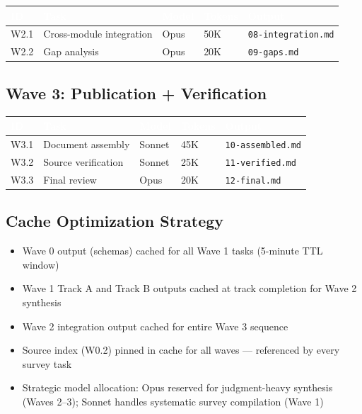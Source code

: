 \documentclass[11pt,letterpaper]{article}
\newcommand{\tableheader}[1]{\textbf{\sffamily\textcolor{white}{#1}}}
\begin{document}
\begin{center}
\begin{tabularx}{\textwidth}{C{0.8cm}L{3cm}C{1.2cm}C{1.2cm}X}
\toprule
{}
\tableheader{ID} & \tableheader{Task} & \tableheader{Model} & \tableheader{Tokens} & \tableheader{Output} \\
\midrule
W2.1 & Cross-module integration & Opus & 50K & \texttt{08-integration.md} \\
W2.2 & Gap analysis & Opus & 20K & \texttt{09-gaps.md} \\
\bottomrule
\end{tabularx}
\end{center}

\subsection{Wave 3: Publication + Verification}

\begin{center}
\begin{tabularx}{\textwidth}{C{0.8cm}L{3cm}C{1.2cm}C{1.2cm}X}
\toprule
{}
\tableheader{ID} & \tableheader{Task} & \tableheader{Model} & \tableheader{Tokens} & \tableheader{Output} \\
\midrule
W3.1 & Document assembly & Sonnet & 45K & \texttt{10-assembled.md} \\
W3.2 & Source verification & Sonnet & 25K & \texttt{11-verified.md} \\
W3.3 & Final review & Opus & 20K & \texttt{12-final.md} \\
\bottomrule
\end{tabularx}
\end{center}

\subsection{Cache Optimization Strategy}

\begin{itemize}[leftmargin=2em]
\item Wave 0 output (schemas) cached for all Wave 1 tasks (5-minute TTL window)
\item Wave 1 Track A and Track B outputs cached at track completion for Wave 2 synthesis
\item Wave 2 integration output cached for entire Wave 3 sequence
\item Source index (W0.2) pinned in cache for all waves --- referenced by every survey task
\item Strategic model allocation: Opus reserved for judgment-heavy synthesis (Waves 2--3); Sonnet handles systematic survey compilation (Wave 1)
\end{itemize}
\end{document}
